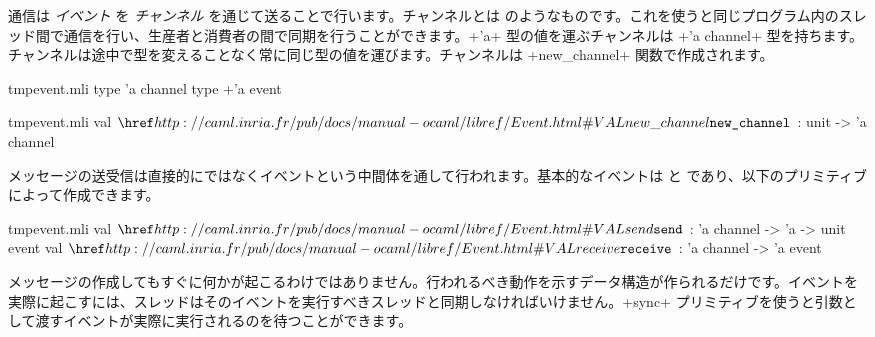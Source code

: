 通信は \emph{イベント} を \emph{チャンネル} を通じて送ることで行います。チャンネルとは  のようなものです。これを使うと同じプログラム内のスレッド間で通信を行い、生産者と消費者の間で同期を行うことができます。\ml+'a+ 型の値を運ぶチャンネルは \ml+'a channel+ 型を持ちます。チャンネルは途中で型を変えることなく常に同じ型の値を運びます。チャンネルは \ml+new_channel+ 関数で作成されます。
%
\begin{codefile}{tmpevent.mli}
type 'a channel
type +'a event
\end{codefile}
%
\begin{listingcodefile}{tmpevent.mli}
val $\indexlibvalue{Event}{new\_channel}$ : unit -> 'a channel
\end{listingcodefile}
%
メッセージの送受信は直接的にではなくイベントという中間体を通して行われます。基本的なイベントは  と  であり、以下のプリミティブによって作成できます。
%
\begin{listingcodefile}{tmpevent.mli}
val $\indexlibvalue{Event}{send}$ : 'a channel -> 'a -> unit event
val $\indexlibvalue{Event}{receive}$ : 'a channel -> 'a event
\end{listingcodefile}
%
メッセージの作成してもすぐに何かが起こるわけではありません。行われるべき動作を示すデータ構造が作られるだけです。イベントを実際に起こすには、スレッドはそのイベントを実行すべきスレッドと同期しなければいけません。\ml+sync+ プリミティブを使うと引数として渡すイベントが実際に実行されるのを待つことができます。
